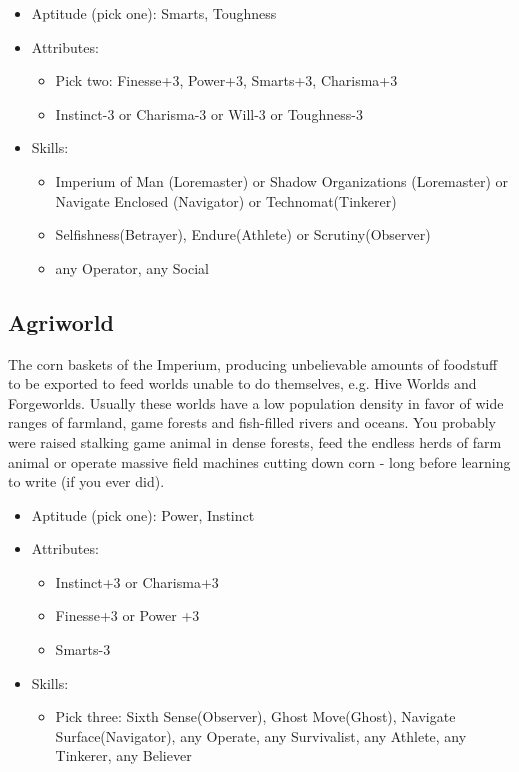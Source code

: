 \begin{itemize}
	\item Aptitude (pick one): Smarts, Toughness
	\item Attributes:
	\begin{itemize}
		\item Pick two: Finesse+3, Power+3, Smarts+3, Charisma+3
		\item Instinct-3 or Charisma-3 or Will-3 or Toughness-3
	\end{itemize}
	\item Skills: 
	\begin{itemize}
	 	\item Imperium of Man (Loremaster) or Shadow Organizations (Loremaster) or Navigate Enclosed (Navigator) or Technomat(Tinkerer)
	 	\item Selfishness(Betrayer), Endure(Athlete) or Scrutiny(Observer)
	 	\item any Operator, any Social
	 \end{itemize} 
\end{itemize}

\subsection{Agriworld}
The corn baskets of the Imperium, producing unbelievable amounts of foodstuff to be exported to feed worlds unable to do themselves, e.g. Hive Worlds and Forgeworlds. Usually these worlds have a low population density in favor of wide ranges of farmland, game forests and fish-filled rivers and oceans. You probably were raised stalking game animal in dense forests, feed the endless herds of farm animal or operate massive field machines cutting down corn - long before learning to write (if you ever did).

\begin{itemize}
	\item Aptitude (pick one): Power, Instinct
	\item Attributes:
	\begin{itemize}
		\item Instinct+3 or Charisma+3
		\item Finesse+3 or Power +3
		\item Smarts-3
	\end{itemize}
	\item Skills: 
	\begin{itemize}
	 	\item Pick three: Sixth Sense(Observer), Ghost Move(Ghost), Navigate Surface(Navigator), any Operate, any Survivalist, any Athlete, any Tinkerer, any Believer
	 \end{itemize} 
\end{itemize}

